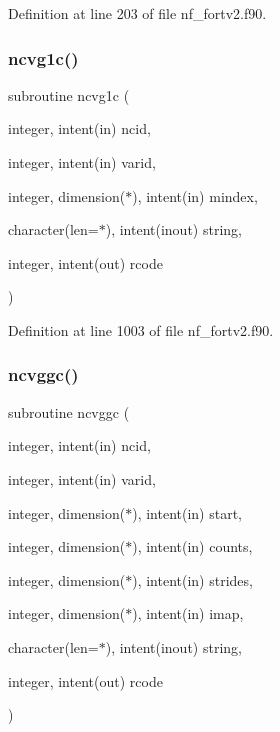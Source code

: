 Definition at line 203 of file nf\+\_\+fortv2.\+f90.

\mbox{\label{nf__fortv2_8f90_ab8326c1d1a7aa3142428092a708f6a10}} 
\subsubsection{\texorpdfstring{ncvg1c()}{ncvg1c()}}
{\footnotesize\ttfamily subroutine ncvg1c (\begin{DoxyParamCaption}\item[{integer, intent(in)}]{ncid,  }\item[{integer, intent(in)}]{varid,  }\item[{integer, dimension($\ast$), intent(in)}]{mindex,  }\item[{character(len=$\ast$), intent(inout)}]{string,  }\item[{integer, intent(out)}]{rcode }\end{DoxyParamCaption})}



Definition at line 1003 of file nf\+\_\+fortv2.\+f90.

\mbox{\label{nf__fortv2_8f90_aa02cb955f7bb1ae0f370492cfaae7b6f}} 
\subsubsection{\texorpdfstring{ncvggc()}{ncvggc()}}
{\footnotesize\ttfamily subroutine ncvggc (\begin{DoxyParamCaption}\item[{integer, intent(in)}]{ncid,  }\item[{integer, intent(in)}]{varid,  }\item[{integer, dimension($\ast$), intent(in)}]{start,  }\item[{integer, dimension($\ast$), intent(in)}]{counts,  }\item[{integer, dimension($\ast$), intent(in)}]{strides,  }\item[{integer, dimension($\ast$), intent(in)}]{imap,  }\item[{character(len=$\ast$), intent(inout)}]{string,  }\item[{integer, intent(out)}]{rcode }\end{DoxyParamCaption})}



